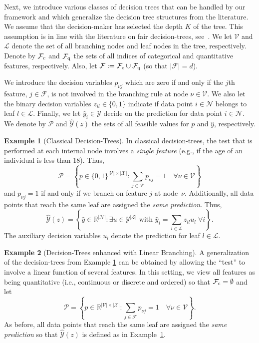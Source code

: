 \documentclass[letterpaper]{article} %
\theoremstyle{definition}
\newtheorem{example}{Example}[section]
\newcommand{\sets}[1]{\ensuremath{\mathcal{#1}}}
\newcommand{\1}{\ensuremath{{\rm e}}} %
\begin{document}
Next, we introduce various classes of decision trees that can be handled by our framework and which generalize the decision tree structures from the literature. We assume that the decision-maker has selected the depth $K$ of the tree. This assumption is in line with the literature on fair decision-trees, see~\cite{Kamiran:2010}. We let $\sets V$ and $\mathcal L$ denote the set of all branching nodes and leaf nodes in the tree, respectively. Denote by $\sets F_{\rm c}$ and $\sets F_{\rm q}$ the sets of all indices of categorical and quantitative features, respectively. Also, let $\sets F:=\sets F_{\rm c} \cup \sets F_{\rm q}$ (so that $|\mathcal F|=d$). 

We introduce the decision variables $p_{\nu j}$ which are zero if and only if the $j$th feature, $j \in \mathcal F$, is not involved in the branching rule at node $\nu \in \mathcal V$. We also let the binary decision variables $z_{il} \in \{0,1\}$ indicate if data point $i \in \mathcal N$ belongs to leaf $l \in \mathcal L$. Finally, we let $\hat y_i \in \mathcal Y$ decide on the prediction for data point $i \in \mathcal N$. We denote by $\mathcal P$ and $\hat {\mathcal Y}(z)$ the sets of all feasible values for $p$ and $\hat y$, respectively.

\begin{example}[Classical Decision-Trees] 
In classical decision-trees, the test that is performed at each internal node involves a \emph{single feature} (e.g., if the age of an individual is less than 18). Thus,
$$
\mathcal P = \left\{ p \in \{0,1\}^{| \mathcal V| \times | \mathcal X|} : \textstyle \sum_{j \in \sets F} p_{\nu j}= 1 \quad \forall \nu \in \mathcal V  \right\}
$$
and $p_{\nu j}=1$ if and only if we branch on feature $j$ at node~$\nu$. Additionally, all data points that reach the same leaf are assigned the \emph{same prediction}. Thus,
$$
\hat {\mathcal Y}(z) =  \left\{ \hat y \in \mathbb R^{| \mathcal N |} : \exists u \in \mathcal Y^{|\mathcal L|} \text{ with } \textstyle \hat y_i = \displaystyle \sum_{l \in \mathcal L} z_{il} u_l \; \forall i  \right\}.
$$
The auxiliary decision variables $u_l$ denote the prediction for leaf $l \in \mathcal L$.
\label{ex:PWC_policies}
\end{example}


\begin{example}[Decision-Trees enhanced with Linear Branching]
A generalization of the decision-trees from Example \ref{ex:PWC_policies} can be obtained by allowing the ``test'' to involve a linear function of several features. In this setting, we view all features as being quantitative (i.e., continuous or discrete and ordered) so that $\mathcal F_{\rm c}=\emptyset$ and let
$$
\mathcal P = \left\{ p \in \mathbb R^{| \mathcal V| \times | \mathcal X|} : \textstyle \sum_{j \in \sets F} p_{\nu j}= 1 \quad \forall \nu \in \mathcal V  \right\}.
$$
As before, all data points that reach the same leaf are assigned the \emph{same prediction} so that
$
\hat{\mathcal Y}(z)
$
is defined as in Example~\ref{ex:PWC_policies}.
\label{ex:PWC_policies_GP}
\end{example}
\end{document}
